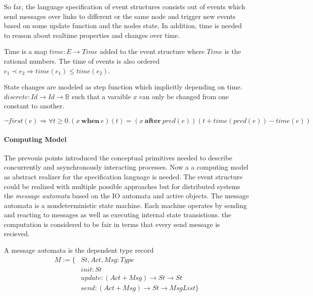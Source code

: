 So far, the language specification of event structures consists out of events
which send messages over links to different or the same node and trigger new
events based on some update function and the nodes state. In addition, time
is needed to reason about realtime properties and changes over time.~\cite{bickford2005causal}

\begin{defi}
  Time is a map $time:E\rightarrow Time$ added to the event structure where $Time$
  is the rational numbers. The time of events is also ordered $e_1\prec e_2\Rightarrow
  time(e_1)\le time(e_2)$.
\end{defi}

\begin{defi}
  State changes are modeled as step function which implicitly depending on time.
  $discrete:Id\rightarrow Id\rightarrow \mathbb{B}$ such that a varaible $x$ can only be changed
  from one constant to another.
\end{defi}

\begin{axiom}
  $\neg first(e)\Rightarrow \forall t\ge 0.(x\ \textbf{when}\ e)(t)=
  (x\ \textbf{after}\ pred(e))(t+time(pred(e))-time(e))$
\end{axiom}

\paragraph{Computing Model}
The prevouis points introduced the conceptual primitives needed to describe
concurrently and asynchronously interacting processes.
Now a a computing model as abstract realizer for the specification language is needed.
The event structure could be realized with multiple possible approaches but
for distributed systems the \textit{message automata} based on the IO automata
and active objects. The message automata is a nondeterministic state machine.
Each machine operates by sending and reacting to messages as well as
executing internal state transistions.
the computation is considered to be fair in terms that every send message is
recieved.~\cite{bickford2003logic}


\begin{defi}
  A message automata is the dependent type record
  \begin{align*}
    M:=\{ & St,Act,Msg:Type\\
        & init:St\\
        & update:(Act+Msg)\rightarrow St\rightarrow St\\
        & send:(Act+Msg)\rightarrow St\rightarrow MsgList\}
  \end{align*}  
\end{defi}

